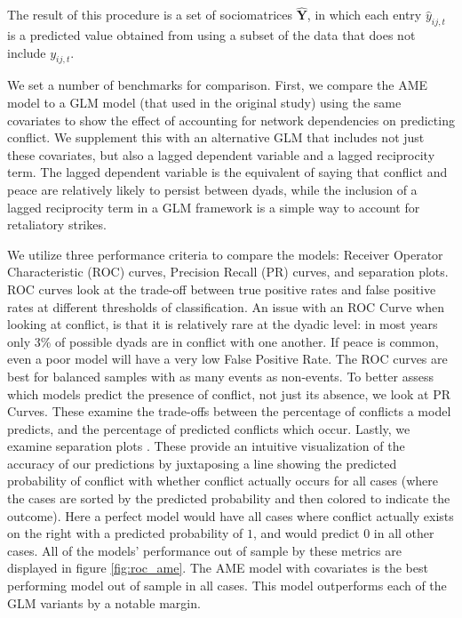 \noindent The result of this procedure is a set of sociomatrices $\bm \hat Y$, in which each entry $\hat y_{ij,t}$ is a predicted value obtained from using a subset of the data that does not include $y_{ij,t}$. 

We set a number of benchmarks for comparison. First, we compare the AME model to a GLM model (that used in the original study) using the same covariates to show the effect of accounting for network dependencies on predicting conflict. We supplement this with an alternative GLM that includes not just these covariates, but also a lagged dependent variable and a lagged reciprocity term. The lagged dependent variable is the equivalent of saying that conflict and peace are relatively likely to persist between dyads, while the inclusion of a lagged reciprocity term in a GLM framework is a simple way to account for retaliatory strikes.

We utilize three performance criteria to compare the models: Receiver Operator Characteristic (ROC) curves, Precision Recall (PR) curves, and separation plots. ROC curves look at the trade-off between true positive rates and false positive rates at different thresholds of classification. An issue with an ROC Curve when looking at conflict, is that it is relatively rare at the dyadic level: in most years only 3\% of possible dyads are in conflict with one another. If peace is common, even a poor model will have a very low False Positive Rate. The ROC curves are best for balanced samples with as many events as non-events. To better assess which models predict the presence of conflict, not just its absence, we look at PR Curves. These examine the trade-offs between the percentage of conflicts a model predicts, and the percentage of predicted conflicts which occur. Lastly, we examine separation plots \citep{greenhill:etal:2011}. These provide an intuitive visualization of the accuracy of our predictions by juxtaposing a line showing the predicted probability of conflict with whether conflict actually occurs for all cases (where the cases are sorted by the predicted probability and then colored to indicate the outcome). Here a perfect model would have all cases where conflict actually exists on the right with a predicted probability of $1$, and would predict $0$ in all other cases. All of the models' performance out of sample by these metrics are displayed in figure \ref{fig:roc_ame}. The AME model with covariates is the best performing model out of sample in all cases. This model outperforms each of the GLM variants by a notable margin.

